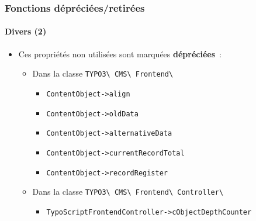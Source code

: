 %

\begin{frame}[fragile]
	\frametitle{Fonctions dépréciées/retirées}
	\framesubtitle{Divers (2)}


	\begin{itemize}
		\item Ces propriétés non utilisées sont marquées \textbf{dépréciées}~:
			\begin{itemize}\small
				\vspace{0.1cm}
				\item Dans la classe \texttt{TYPO3\textbackslash
					CMS\textbackslash
					Frontend\textbackslash}
					\begin{itemize}
						\item \texttt{ContentObject->align}
						\item \texttt{ContentObject->oldData}
						\item \texttt{ContentObject->alternativeData}
						\item \texttt{ContentObject->currentRecordTotal}
						\item \texttt{ContentObject->recordRegister}
					\end{itemize}
				\vspace{0.1cm}
				\item Dans la classe \texttt{TYPO3\textbackslash
					CMS\textbackslash
					Frontend\textbackslash
					Controller\textbackslash}
					\begin{itemize}
						\item \texttt{TypoScriptFrontendController->cObjectDepthCounter}
					\end{itemize}
			\end{itemize}\normalsize
	\end{itemize}

\end{frame}

